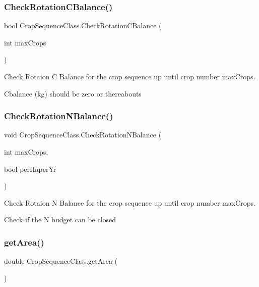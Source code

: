 \subsubsection{\texorpdfstring{CheckRotationCBalance()}{CheckRotationCBalance()}}
{\footnotesize\ttfamily bool Crop\+Sequence\+Class.\+Check\+Rotation\+C\+Balance (\begin{DoxyParamCaption}\item[{int}]{max\+Crops }\end{DoxyParamCaption})\hspace{0.3cm}{\ttfamily [inline]}}



Check Rotaion C Balance for the crop sequence up until crop number max\+Crops. 

Cbalance (kg) should be zero or thereabouts \mbox{\label{class_crop_sequence_class_aa078d5e9470d8f731d42275788fdf3d4}} 
\subsubsection{\texorpdfstring{CheckRotationNBalance()}{CheckRotationNBalance()}}
{\footnotesize\ttfamily void Crop\+Sequence\+Class.\+Check\+Rotation\+N\+Balance (\begin{DoxyParamCaption}\item[{int}]{max\+Crops,  }\item[{bool}]{per\+Haper\+Yr }\end{DoxyParamCaption})\hspace{0.3cm}{\ttfamily [inline]}}



Check Rotaion N Balance for the crop sequence up until crop number max\+Crops. 

Check if the N budget can be closed \mbox{\label{class_crop_sequence_class_aa8158757aaa97946f03d91b39a2b597e}} 
\subsubsection{\texorpdfstring{getArea()}{getArea()}}
{\footnotesize\ttfamily double Crop\+Sequence\+Class.\+get\+Area (\begin{DoxyParamCaption}{ }\end{DoxyParamCaption})\hspace{0.3cm}{\ttfamily [inline]}}



